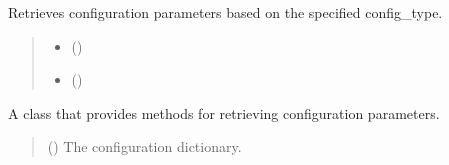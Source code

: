 \documentclass[a4paper,11pt,english,openany]{sphinxmanual}
\begin{document}
\begin{fulllineitems}
\begin{fulllineitems}
\end{fulllineitems}


\begin{fulllineitems}
\label{\detokenize{api/spyice.utils.config_sort:src.spyice.utils.config_sort.ConfigSort.getconfig_dataclass}}
\pysigstartsignatures
\pysiglinewithargsret
{}
{\sphinxparamcomma {}}
{}
\pysigstopsignatures
\sphinxAtStartPar
Retrieves configuration parameters based on the specified config\_type.
\begin{quote}\begin{description}
\begin{itemize}
\item {} 
\sphinxAtStartPar
{} ()

\item {} 
\sphinxAtStartPar
{} ()

\end{itemize}

\sphinxAtStartPar
{}

\end{description}\end{quote}

\end{fulllineitems}


\begin{fulllineitems}
\label{\detokenize{api/spyice.utils.config_sort:src.spyice.utils.config_sort.ConfigSort.__init__}}
\pysigstartsignatures
\pysiglinewithargsret
{}
{}
{}
\pysigstopsignatures
\sphinxAtStartPar
A class that provides methods for retrieving configuration parameters.
\begin{quote}\begin{description}
\sphinxAtStartPar
{} () \textendash{} The configuration dictionary.


\end{description}
\end{quote}
\end{fulllineitems}
\end{fulllineitems}
\end{document}

